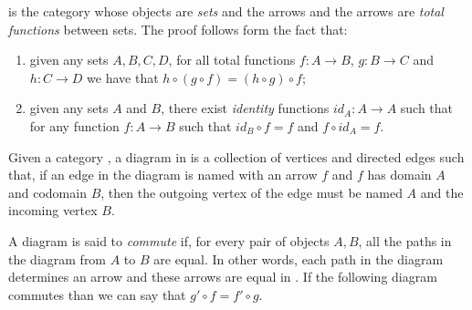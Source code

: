 \begin{example}  is the category whose objects are \emph{sets} and the arrows and the arrows are \emph{total functions} between sets. The proof follows form the fact that:

\begin{enumerate}
  \item given any sets $A,B,C,D$, for all total functions $f : A \rightarrow B$, $g : B \rightarrow C$ and $h : C \rightarrow D$ we have that $h \circ (g \circ f) = (h \circ g) \circ f$;

  \item given any sets $A$ and $B$, there exist \emph{identity} functions $id_A : A \rightarrow A$ such that for any function $f : A \rightarrow B$ such that $id_B \circ f = f$ and $f \circ id_A = f$.
\end{enumerate}
\end{example}


\begin{definition}[Diagram] Given a category , a diagram in  is a collection of vertices and directed edges such that, if an edge in the diagram is named with an arrow $f$ and $f$ has domain $A$ and codomain $B$, then the outgoing vertex of the edge must be named $A$ and the incoming vertex $B$.

  A diagram is said to \emph{commute} if, for every pair of objects $A,B$, all the paths in the diagram from $A$ to $B$ are equal. In other words, each path in the diagram determines an arrow and these arrows are equal in . If the following diagram commutes than we can say that \mbox{$g' \circ f = f' \circ g$}.


\end{definition}

